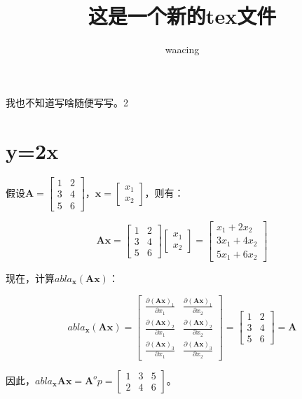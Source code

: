 \documentclass[UTF8,a4paper,10pt]{article} %
\title{这是一个新的tex文件}
\author{waacing}
\begin{document}
	\maketitle %
	我也不知道写啥随便写写。2

\section{y=2x}

假设$\mathbf{A} = \begin{bmatrix} 1 & 2 \\ 3 & 4 \\ 5 & 6 \end{bmatrix}$，$\mathbf{x} = \begin{bmatrix} x_1 \\ x_2 \end{bmatrix}$，则有：

$$\mathbf{A} \mathbf{x} = \begin{bmatrix} 1 & 2 \\ 3 & 4 \\ 5 & 6 \end{bmatrix} \begin{bmatrix} x_1 \\ x_2 \end{bmatrix} = \begin{bmatrix} x_1 + 2x_2 \\ 3x_1 + 4x_2 \\ 5x_1 + 6x_2 \end{bmatrix}$$

现在，计算$
abla_{\mathbf{x}} (\mathbf{A} \mathbf{x})$：

$$
abla_{\mathbf{x}} (\mathbf{A} \mathbf{x}) = \begin{bmatrix} \frac{\partial (\mathbf{A} \mathbf{x})_1}{\partial x_1} & \frac{\partial (\mathbf{A} \mathbf{x})_1}{\partial x_2} \\ \frac{\partial (\mathbf{A} \mathbf{x})_2}{\partial x_1} & \frac{\partial (\mathbf{A} \mathbf{x})_2}{\partial x_2} \\ \frac{\partial (\mathbf{A} \mathbf{x})_3}{\partial x_1} & \frac{\partial (\mathbf{A} \mathbf{x})_3}{\partial x_2} \end{bmatrix} = \begin{bmatrix} 1 & 2 \\ 3 & 4 \\ 5 & 6 \end{bmatrix} = \mathbf{A}$$

因此，$
abla_{\mathbf{x}} \mathbf{A} \mathbf{x} = \mathbf{A}^	op = \begin{bmatrix} 1 & 3 & 5 \\ 2 & 4 & 6 \end{bmatrix}$。
\end{document}
